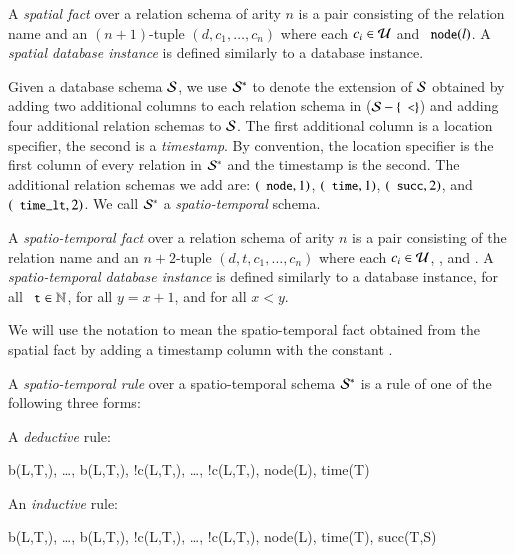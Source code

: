 A {\em spatial fact} over a relation schema of arity $n$ is a pair consisting of the relation name and an $(n+1)$-tuple $(d,c_1,\ldots,c_n)$ where each $c_i \in \mathcal{U}$ and $\dedalus{node}(l)$.  A {\em spatial database instance} is defined similarly to a database instance.

Given a database schema $\mathcal{S}$, we use $\mathcal{S}^*$ to denote the extension of
$\mathcal{S}$ obtained by adding two additional columns to each relation schema in ($\schema - \{\dedalus{<}\}$) and adding four additional relation schemas to $\mathcal{S}$. 
The first additional column is a location specifier, the second is a {\em timestamp}.  By convention, the location specifier is the first column of every relation in $\mathcal{S}^*$ and the timestamp is the second.  
The additional relation schemas we add are: $(\dedalus{node},1)$,
$(\dedalus{time},1)$, $(\dedalus{succ},2)$, and $(\dedalus{time_lt},2)$.
We call $\mathcal{S}^*$ a {\em spatio-temporal} schema.

A {\em spatio-temporal fact} over a relation schema of arity $n$ is a pair consisting of the relation name and an $n+2$-tuple $(d,t,c_1,\ldots,c_n)$ where each $c_i \in \mathcal{U}$, , and .  A {\em spatio-temporal database instance} is defined similarly to a database instance,  for all $\dedalus{t} \in \mathbb{N}$,  for all $y = x + 1$, and  for all $x < y$.

We will use the notation  to mean the spatio-temporal fact obtained from the spatial fact  by adding a timestamp column with the constant .

A {\em spatio-temporal rule} over a spatio-temporal schema $\mathcal{S}^*$ is a rule of one of the following three forms:

A {\em deductive} rule:

\begin{Drules}
        {b(L,T,), \ldots, b(L,T,), !c(L,T,), \ldots, !c(L,T,), node(L), time(T)}
\end{Drules}

An {\em inductive} rule:

\begin{Drules}
        {b(L,T,), \ldots, b(L,T,), !c(L,T,), \ldots, !c(L,T,), node(L), time(T), succ(T,S)}
\end{Drules}


